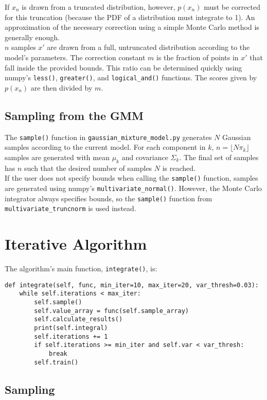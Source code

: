 \documentclass{article}
\begin{document}
If $x_n$ is drawn from a truncated distribution, however, $p(x_n)$ must be corrected
for this truncation (because the PDF of a distribution must integrate to 1).
An approximation of the necessary correction using a simple Monte Carlo method is
generally enough. \\

$n$ samples $x'$ are drawn from a full, untruncated distribution
according to the model's parameters. The correction constant $m$ is the
fraction of points in $x'$ that fall inside the provided bounds. This ratio can
be determined quickly using numpy's \texttt{less()}, \texttt{greater()}, and
\texttt{logical\_and()} functions. The scores given by $p(x_n)$ are then divided
by $m$.

\subsection{Sampling from the GMM}

The \texttt{sample()} function in \texttt{gaussian\_mixture\_model.py} generates
$N$ Gaussian samples according to the current model. For each component in $k$,
$n = \lfloor N\pi_k \rfloor$ samples are generated with mean $\mu_k$ and
covariance $\Sigma_k$. The final set of samples has $n$ such that the desired
number of samples $N$ is reached. \\

If the user does not specify bounds when calling the \texttt{sample()} function,
samples are generated using numpy's \texttt{multivariate\_normal()}. However,
the Monte Carlo integrator always specifies bounds, so the \texttt{sample()}
function from \texttt{multivariate\_truncnorm} is used instead.

\section{Iterative Algorithm}

The algorithm's main function, \texttt{integrate()}, is:
\begin{verbatim}
def integrate(self, func, min_iter=10, max_iter=20, var_thresh=0.03):
    while self.iterations < max_iter:
        self.sample()
        self.value_array = func(self.sample_array)
        self.calculate_results()
        print(self.integral)
        self.iterations += 1
        if self.iterations >= min_iter and self.var < var_thresh:
            break
        self.train()
\end{verbatim}

\subsection{Sampling}
\end{document}
